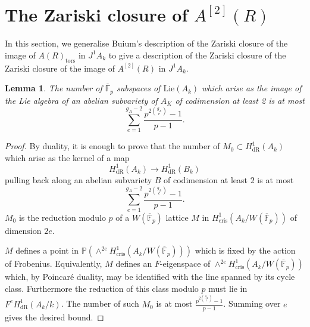 \documentclass[11pt]{amsart}
\newcommand{\dR}{\mathrm{dR}}
\newcommand{\tors}{\mathrm{tors}}
\newcommand{\Lie}{\mathrm{Lie}}
\newcommand{\End}{\mathrm{End}}
\theoremstyle{plain}
\newtheorem{lemma}{Lemma}
\theoremstyle{definition}
\newcommand{\F}{\mathbb{F}}
\newcommand{\Hom}{\mathrm{Hom}}
\newcommand{\cris}{\mathrm{cris}}
\newcommand{\nab}{\nabla_{0}^{1}}
\begin{document}
%
\section{The Zariski closure of $A^{[2]}(R)$}\label{sec:1.5}
In this section, we generalise Buium's description of the Zariski closure of the image of $A(R)_{\tors }$ in $J^1 A_k $ to give a description of the Zariski closure of the Zariski closure of the image of $A^{[2]}(R)$ in $J^1 A_k $.
\begin{lemma}\label{lemma:dubious}
The number of $\overline{\F }_p $ subspaces of $\Lie (A_k )$ which arise as the image of the Lie algebra of an abelian subvariety of $A_K$ of codimension at least 2 is at most
\[
\sum _{e=1}^{g_A -2}\frac{p^{2\binom{g_A}{e}}-1}{p-1}.
\]
\end{lemma}
\begin{proof}
By duality, it is enough to prove that the number of $M_0 \subset H^1 _{\dR }(A_k )$ which arise as the kernel of a map
\[
H^1 _{\dR}(A_k )\to H^1 _{\dR}(B_k )
\]
pulling back along an abelian subvariety $B$ of codimension at least $2$ is at most
\[
\sum _{e=1}^{g_A -2}\frac{p^{2\binom{g_A }{e}}-1}{p-1}.
\]
$M_0$ is the reduction modulo $p$ of a $W(\overline{\F }_p )$ lattice $M$ in $H^1 _{\cris }(A_k /W(\overline{\F }_p ))$ of dimension $2e$.

$M$ defines a point in $\mathbb{P}(\wedge ^{2e} H^1 _{\cris }(A_k /W(\overline{\F }_p )))$ which is fixed by the action of Frobenius. Equivalently, $M$ defines an $F$-eigenspace of $\wedge ^{2e} H^1 _{\cris }(A_k /W(\overline{\F }_p ))$ which, by Poincar\'e duality, may be identified with the line spanned by its cycle class. Furthermore the reduction of this class modulo $p$ must lie in $F^e H^1 _{\dR}(A_k /k)$. The number of such $M_0$ is at most $\frac{p^{2\binom{g_A }{e}}-1}{p-1}$. Summing over $e$ gives the desired bound.
\end{proof}
\end{document}
